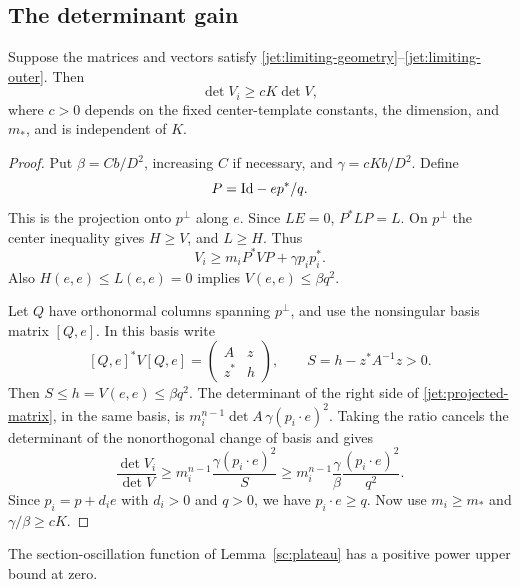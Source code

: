 \subsection{The determinant gain}

\begin{lemma}
\label{jet:matrix}
Suppose the matrices and vectors satisfy
\eqref{jet:limiting-geometry}--\eqref{jet:limiting-outer}.
Then
\begin{equation}\label{jet:matrix-gain}
 \det V_i\ge cK\det V,
\end{equation}
where $c>0$ depends on the fixed center-template constants,
the dimension, and $m_*$, and is independent of $K$.
\end{lemma}

\begin{proof}
Put $\beta=Cb/D^2$, increasing $C$ if necessary, and
$\gamma=cKb/D^2$. Define
\[
 P=\mathrm{Id}-e p^*/q.
\]
This is the projection onto $p^\perp$ along $e$.
Since $LE=0$, $P^*LP=L$. On $p^\perp$ the center inequality
gives $H\ge V$, and $L\ge H$. Thus
\begin{equation}\label{jet:projected-matrix}
 V_i\ge m_iP^*VP+\gamma p_ip_i^*.
\end{equation}
Also $H(e,e)\le L(e,e)=0$ implies
$V(e,e)\le\beta q^2$.

Let $Q$ have orthonormal columns spanning $p^\perp$, and
use the nonsingular basis matrix $[Q,e]$. In this basis write
\[
 [Q,e]^*V[Q,e]
 =\begin{pmatrix} A&z\\z^*&h\end{pmatrix},\qquad
 S=h-z^*A^{-1}z>0.
\]
Then $S\le h=V(e,e)\le\beta q^2$.
The determinant of the right side of
\eqref{jet:projected-matrix}, in the same basis, is
$m_i^{n-1}\det A\,\gamma(p_i\cdot e)^2$.
Taking the ratio cancels the determinant of the
nonorthogonal change of basis and gives
\[
 \frac{\det V_i}{\det V}
 \ge m_i^{n-1}\frac{\gamma(p_i\cdot e)^2}{S}
 \ge m_i^{n-1}\frac{\gamma}{\beta}
        \frac{(p_i\cdot e)^2}{q^2}.
\]
Since $p_i=p+d_ie$ with $d_i>0$ and $q>0$, we have
$p_i\cdot e\ge q$. Now use $m_i\ge m_*$ and
$\gamma/\beta\ge cK$.
\end{proof}

\begin{proposition}
\label{jet:contradiction}
The section-oscillation function of Lemma~\ref{sc:plateau}
has a positive power upper bound at zero.
\end{proposition}

